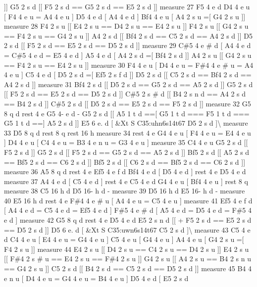 \mbox{]}\mbox{]} G5 2 s d \mbox{[}\mbox{[} F5 2 s d == G5 2 s d == E5 2 s d \mbox{]}\mbox{]} measure 27 F5 4 e d D4 4 e u \mbox{[} F4 4 e u = A4 4 e u \mbox{]} D5 4 e d \mbox{[} A4 4 e d \mbox{]} Bf4 4 e u \mbox{[} A4 2 s u =\mbox{[} G4 2 s u \mbox{]}\mbox{]} measure 28 F4 2 s u \mbox{[}\mbox{[} E4 2 s u == D4 2 s u == E4 2 s u \mbox{]}\mbox{]} F4 2 s u \mbox{[}\mbox{[} G4 2 s u == F4 2 s u == G4 2 s u \mbox{]}\mbox{]} A4 2 s d \mbox{[}\mbox{[} Bf4 2 s d == C5 2 s d == A4 2 s d \mbox{]}\mbox{]} D5 2 s d \mbox{[}\mbox{[} F5 2 s d == E5 2 s d == D5 2 s d \mbox{]}\mbox{]} measure 29 C\#5 4 e \# d \mbox{[} A4 4 e d = C\#5 4 e d = E5 4 e d \mbox{]} A5 4 e d \mbox{[} A4 2 s d =\mbox{[} Bf4 2 s d \mbox{]}\mbox{]} A4 2 s u \mbox{[}\mbox{[} G4 2 s u == F4 2 s u == E4 2 s u \mbox{]}\mbox{]} measure 30 F4 4 e u \mbox{[} D4 4 e u = F\#4 4 e \# u = A4 4 e u \mbox{]} C5 4 e d \mbox{[} D5 2 s d =\mbox{[} Ef5 2 s f d \mbox{]}\mbox{]} D5 2 s d \mbox{[}\mbox{[} C5 2 s d == Bf4 2 s d == A4 2 s d \mbox{]}\mbox{]} measure 31 Bf4 2 s d \mbox{[}\mbox{[} D5 2 s d == G5 2 s d == A5 2 s d \mbox{]}\mbox{]} G5 2 s d \mbox{[}\mbox{[} F5 2 s d == E5 2 s d == D5 2 s d \mbox{]}\mbox{]} C\#5 2 s \# d \mbox{[}\mbox{[} B4 2 s n d == A4 2 s d == B4 2 s d \mbox{]}\mbox{]} C\#5 2 s d \mbox{[}\mbox{[} D5 2 s d == E5 2 s d == F5 2 s d \mbox{]}\mbox{]} measure 32 G5 8 q d rest 4 e G5 4-\/ e d -\/ G5 2 s d \mbox{[}\mbox{[} A5 1 t d ==\mbox{[} G5 1 t d === F5 1 t d === G5 1 t d ==\mbox{]} A5 2 s d \mbox{]}\mbox{]} E5 6 e. d \mbox{[} \&Xt S C35\+:uhn6s14t67 D5 2 s d \mbox{]}\textbackslash{} measure 33 D5 8 q d rest 8 q rest 16 h measure 34 rest 4 e G4 4 e u \mbox{[} F4 4 e u = E4 4 e u \mbox{]} D4 4 e u \mbox{[} C4 4 e u = B3 4 e n u = G3 4 e u \mbox{]} measure 35 C4 4 e u G5 2 s d \mbox{[}\mbox{[} F5 2 s d \mbox{]}\mbox{]} G5 2 s d \mbox{[}\mbox{[} F5 2 s d == G5 2 s d == A5 2 s d \mbox{]}\mbox{]} Bf5 2 s d \mbox{[}\mbox{[} A5 2 s d == Bf5 2 s d == C6 2 s d \mbox{]}\mbox{]} Bf5 2 s d \mbox{[}\mbox{[} C6 2 s d == Bf5 2 s d == C6 2 s d \mbox{]}\mbox{]} measure 36 A5 8 q d rest 4 e Ef5 4 e f d Bf4 4 e d \mbox{[} D5 4 e d \mbox{]} rest 4 e D5 4 e d measure 37 A4 4 e d \mbox{[} C5 4 e d \mbox{]} rest 4 e C5 4 e d G4 4 e u \mbox{[} Bf4 4 e u \mbox{]} rest 8 q measure 38 C5 16 h d D5 16-\/ h d -\/ measure 39 D5 16 h d E5 16-\/ h d -\/ measure 40 E5 16 h d rest 4 e F\#4 4 e \# u \mbox{[} A4 4 e u = C5 4 e u \mbox{]} measure 41 Ef5 4 e f d \mbox{[} A4 4 e d = C5 4 e d = Ef5 4 e d \mbox{]} F\#5 4 e \# d \mbox{[} A5 4 e d = D5 4 e d = F\#5 4 e d \mbox{]} measure 42 G5 8 q d rest 4 e D5 4 e d E5 2 s n d \mbox{[}\mbox{[} + F5 2 s d == E5 2 s d == D5 2 s d \mbox{]}\mbox{]} D5 6 e. d \mbox{[} \&Xt S C35\+:uwn6s14t67 C5 2 s d \mbox{]}\textbackslash{} measure 43 C5 4 e d C4 4 e u \mbox{[} E4 4 e u = G4 4 e u \mbox{]} C5 4 e u \mbox{[} G4 4 e u \mbox{]} A4 4 e u \mbox{[} G4 2 s u =\mbox{[} F4 2 s u \mbox{]}\mbox{]} measure 44 E4 2 s u \mbox{[}\mbox{[} D4 2 s u == C4 2 s u == D4 2 s u \mbox{]}\mbox{]} E4 2 s u \mbox{[}\mbox{[} F\#4 2 s \# u == E4 2 s u == F\#4 2 s u \mbox{]}\mbox{]} G4 2 s u \mbox{[}\mbox{[} A4 2 s u == B4 2 s n u == G4 2 s u \mbox{]}\mbox{]} C5 2 s d \mbox{[}\mbox{[} B4 2 s d == C5 2 s d == D5 2 s d \mbox{]}\mbox{]} measure 45 B4 4 e n u \mbox{[} D4 4 e u = G4 4 e u = B4 4 e u \mbox{]} D5 4 e d \mbox{[} E5 2 s d 